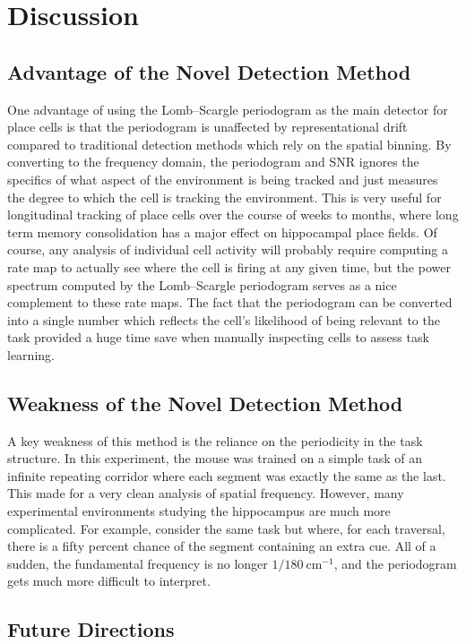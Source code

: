 \documentclass[preprint]{aastex701}
\begin{document}
\section{Discussion}

\subsection{Advantage of the Novel Detection Method}
One advantage of using the Lomb--Scargle periodogram as the main detector for place cells is that the periodogram is unaffected by representational drift compared to traditional detection methods which rely on the spatial binning. By converting to the frequency domain, the periodogram and SNR ignores the specifics of what aspect of the environment is being tracked and just measures the degree to which the cell is tracking the environment. This is very useful for longitudinal tracking of place cells over the course of weeks to months, where long term memory consolidation has a major effect on hippocampal place fields. Of course, any analysis of individual cell activity will probably require computing a rate map to actually see where the cell is firing at any given time, but the power spectrum computed by the Lomb--Scargle periodogram serves as a nice complement to these rate maps. The fact that the periodogram can be converted into a single number which reflects the cell's likelihood of being relevant to the task provided a huge time save when manually inspecting cells to assess task learning. 

\subsection{Weakness of the Novel Detection Method}
A key weakness of this method is the reliance on the periodicity in the task structure. In this experiment, the mouse was trained on a simple task of an infinite repeating corridor where each segment was exactly the same as the last. This made for a very clean analysis of spatial frequency. However, many experimental environments studying the hippocampus are much more complicated. For example, consider the same task but where, for each traversal, there is a fifty percent chance of the segment containing an extra cue. All of a sudden, the fundamental frequency is no longer \(1/180~\mathrm{cm}^{-1}\), and the periodogram gets much more difficult to interpret. 

\subsection{Future Directions}
\end{document}
